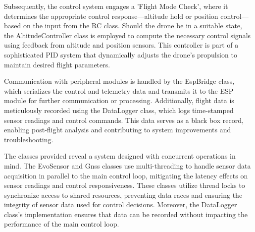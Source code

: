 \documentclass{article}
\begin{document}
Subsequently, the control system engages a 'Flight Mode Check', where it determines the appropriate control response—altitude hold or position control—based on the input from the RC class. Should the drone be in a suitable state, the AltitudeController class is employed to compute the necessary control signals using feedback from 
altitude and position sensors. This controller is part of a sophisticated PID system that dynamically adjusts the drone's propulsion to maintain desired flight parameters.

Communication with peripheral modules is handled by the EspBridge class, which serializes the control and telemetry data and transmits it to the ESP module for further communication or processing. Additionally, flight data is meticulously recorded using the DataLogger class, which logs time-stamped sensor readings and control commands. 
This data serves as a black box record, enabling post-flight analysis and contributing to system improvements and troubleshooting.

The classes provided reveal a system designed with concurrent operations in mind. The EvoSensor and Gnss classes use multi-threading to handle sensor data acquisition in parallel to the main control loop, mitigating the latency effects on sensor readings and control responsiveness. These classes utilize thread locks to synchronize 
access to shared resources, preventing data races and ensuring the integrity of sensor data used for control decisions. Moreover, the DataLogger class's implementation ensures that data can be recorded without impacting the performance of the main control loop.
\end{document}
